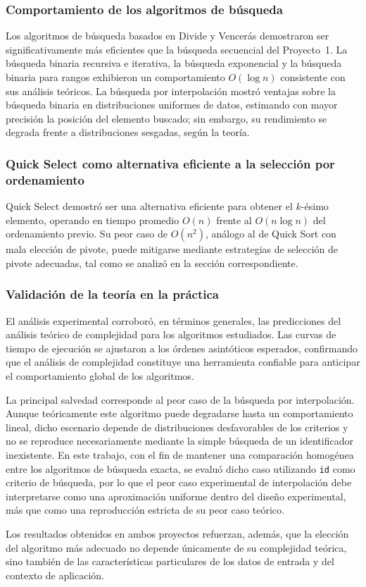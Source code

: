 \subsubsection*{Comportamiento de los algoritmos de búsqueda}

Los algoritmos de búsqueda basados en Divide y Vencerás demostraron ser significativamente más eficientes que la búsqueda secuencial del Proyecto~1. La búsqueda binaria recursiva e iterativa, la búsqueda exponencial y la búsqueda binaria para rangos exhibieron un comportamiento $O(\log n)$ consistente con sus análisis teóricos. La búsqueda por interpolación mostró ventajas sobre la búsqueda binaria en distribuciones uniformes de datos, estimando con mayor precisión la posición del elemento buscado; sin embargo, su rendimiento se degrada frente a distribuciones sesgadas, según la teoría.

\subsubsection*{Quick Select como alternativa eficiente a la selección por ordenamiento}

Quick Select demostró ser una alternativa eficiente para obtener el $k$-ésimo elemento, operando en tiempo promedio $O(n)$ frente al $O(n \log n)$ del ordenamiento previo. Su peor caso de $O(n^2)$, análogo al de Quick Sort con mala elección de pivote, puede mitigarse mediante estrategias de selección de pivote adecuadas, tal como se analizó en la sección correspondiente.

\subsubsection*{Validación de la teoría en la práctica}

El análisis experimental corroboró, en términos generales, las predicciones del análisis teórico de complejidad para los algoritmos estudiados. Las curvas de tiempo de ejecución se ajustaron a los órdenes asintóticos esperados, confirmando que el análisis de complejidad constituye una herramienta confiable para anticipar el comportamiento global de los algoritmos.

La principal salvedad corresponde al peor caso de la búsqueda por interpolación. Aunque teóricamente este algoritmo puede degradarse hasta un comportamiento lineal, dicho escenario depende de distribuciones desfavorables de los criterios y no se reproduce necesariamente mediante la simple búsqueda de un identificador inexistente. En este trabajo, con el fin de mantener una comparación homogénea entre los algoritmos de búsqueda exacta, se evaluó dicho caso utilizando \texttt{id} como criterio de búsqueda, por lo que el peor caso experimental de interpolación debe interpretarse como una aproximación uniforme dentro del diseño experimental, más que como una reproducción estricta de su peor caso teórico.

Los resultados obtenidos en ambos proyectos refuerzan, además, que la elección del algoritmo más adecuado no depende únicamente de su complejidad teórica, sino también de las características particulares de los datos de entrada y del contexto de aplicación.
